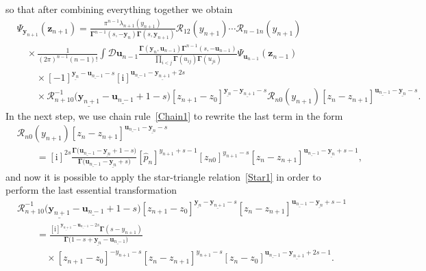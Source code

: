 \documentclass[10pt,a4paper]{amsart}
\renewcommand{\imath}{\mathrm{i}}
\numberwithin{equation}{section}
\begin{document}
so that after combining everything together we obtain
\begin{align*}
	&
\Psi_{\bm{y}_{n+1}}(\bm{z}_{n+1}) =
\frac{\pi^{n-1} \lambda_{n+1}(y_{n+1})}
{\mathbf{\Gamma}^{n-1}(s ,-\bm{y}_{n})
\mathbf{\Gamma}(s ,\bm{y}_{n+1})}
\mathcal{R}_{12}(y_{n+1})\cdots
\mathcal{R}_{n-1 n}(y_{n+1})\\
& \quad\times
\frac{1}
{(2\pi)^{n-1} (n-1)!} \int \mathcal{D}\bm{u}_{n-1}
\frac{\mathbf{\Gamma}(\bm y_{n},\bm u_{n-1}) \mathbf{\Gamma}^{n-1}(s ,-\bm{u}_{n-1})}
{\prod\limits_{i<j}\mathbf{\Gamma}(u_{ij})\mathbf{\Gamma}(u_{ji})}
\Psi_{\bm{u}_{n-1}}(\bm{z}_{n-1}) \\
& \qquad \times
[-1]^{\underline{\bm{y}_{n}}-\underline{\bm{u}_{n-1}}-s}
[\imath]^{\underline{\bm{u}_{n-1}}-\underline{\bm{y}_{n+1}}+2s}
\\
& \qquad \times
\mathcal{R}^{-1}_{n+1 0}
\bigl(\underline{\bm{y}_{n+1}}-\underline{\bm{u}_{n-1}}+1-s\bigr)
[z_{n+1}-z_0]^{\underline{\bm{y}_{n}}-\underline{\bm{y}_{n+1}}-s}
\mathcal{R}_{n 0}(y_{n+1})
[z_n-z_{n+1}]^{\underline{\bm{u}_{n-1}}-\underline{\bm{y}_{n}}-s}.
\end{align*}
In the next step, we use chain rule~\eqref{Chain1} to rewrite the
last term in the form
\begin{align*}
&
\mathcal{R}_{n 0}(y_{n+1})
[z_n-z_{n+1}]^{\underline{\bm{u}_{n-1}}-\underline{\bm{y}_{n}}-s} \\
& \qquad =
[\imath]^{2s}\frac{\mathbf{\Gamma}\bigl(\underline{\bm{u}_{n-1}}-
\underline{\bm{y}_{n}}+1-s\bigr)}
{\mathbf{\Gamma}\bigl(\underline{\bm{u}_{n-1}}-
\underline{\bm{y}_{n}}+s\bigr)}
[\hat{p}_n]^{y_{n+1}+s-1}
[z_{n0}]^{y_{n+1}-s}
[z_n-z_{n+1}]^{\underline{\bm{u}_{n-1}}-\underline{\bm{y}_{n}}+s-1} ,
\end{align*}
and now it is possible to apply the star-triangle relation~\eqref{Star1}
in order to perform the last essential transformation
\begin{align*}
&
\mathcal{R}^{-1}_{n+1 0}
\bigl(\underline{\bm{y}_{n+1}}-\underline{\bm{u}_{n-1}}+1-s\bigr)
[z_{n+1}-z_0]^{\underline{\bm{y}_{n}}-\underline{\bm{y}_{n+1}}-s}
[z_n-z_{n+1}]^{\underline{\bm{u}_{n-1}}-\underline{\bm{y}_{n}}+s-1} \\
& \qquad =
\frac{[\imath]^{\underline{\bm{y}_{n+1}}-
\underline{\bm{u}_{n-1}}-2s} \mathbf{\Gamma}(s-y_{n+1})}
{\mathbf{\Gamma}\bigl(1-s+\underline{\bm{y}_{n}}-
\underline{\bm{u}_{n-1}}\bigr)} \\
& \qquad\quad \times
[z_{n+1}-z_0]^{-y_{n+1}-s}
[z_n-z_{n+1}]^{y_{n+1}-s}
[z_n-z_0]^{\underline{\bm{u}_{n-1}}-
\underline{\bm{y}_{n+1}}+2s-1} .
\end{align*}
\end{document}
